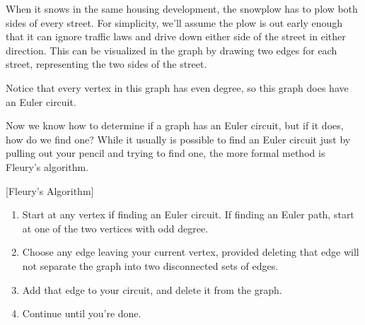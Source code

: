 \begin{example}{}%
When it snows in the same housing development, the snowplow has to plow both sides of every street.  For simplicity, we'll assume the plow is out early enough that it can ignore traffic laws and drive down either side of the street in either direction.  This can be visualized in the graph by drawing two edges for each street, representing the two sides of the street.\\


Notice that every vertex in this graph has even degree, so this graph does have an Euler circuit.  
\end{example}

Now we know how to determine if a graph has an Euler circuit, but if it does, how do we find one?  While it usually is possible to find an Euler circuit just by pulling out your pencil and trying to find one, the more formal method is Fleury's algorithm.

\begin{algorithm}{}{}[Fleury's Algorithm]
\hspace{3in}
\begin{enumerate}
\item	Start at any vertex if finding an Euler circuit.  If finding an Euler path, start at one of the two vertices with odd degree.
\item	Choose any edge leaving your current vertex, provided deleting that edge will not separate the graph into two disconnected sets of edges.
\item	Add that edge to your circuit, and delete it from the graph.
\item	Continue until you're done.
\end{enumerate}
\end{algorithm}

